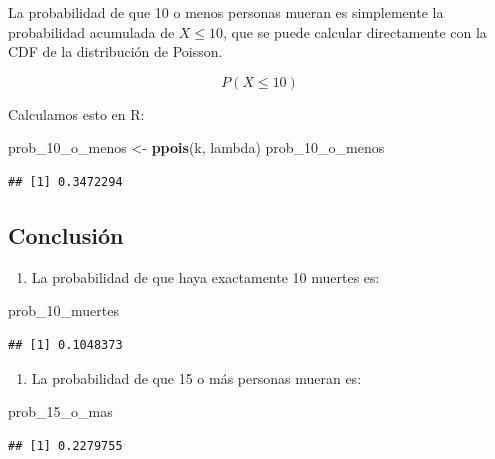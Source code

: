 \documentclass[
]{article}
\newenvironment{Shaded}{\begin{snugshade}}{\end{snugshade}}
\newcommand{\FunctionTok}[1]{\textcolor[rgb]{0.13,0.29,0.53}{\textbf{#1}}}
\newcommand{\NormalTok}[1]{#1}
\newcommand{\OtherTok}[1]{\textcolor[rgb]{0.56,0.35,0.01}{#1}}
\providecommand{\tightlist}{%
  \setlength{\itemsep}{0pt}\setlength{\parskip}{0pt}}
\begin{document}
La probabilidad de que 10 o menos personas mueran es simplemente la probabilidad acumulada de \(X \leq 10\), que se puede calcular directamente con la CDF de la distribución de Poisson.

\[ P(X \leq 10) \]

Calculamos esto en R:

\begin{Shaded}
\begin{Highlighting}[]
\NormalTok{prob\_10\_o\_menos }\OtherTok{\textless{}{-}} \FunctionTok{ppois}\NormalTok{(k, lambda)}
\NormalTok{prob\_10\_o\_menos}
\end{Highlighting}
\end{Shaded}

\begin{verbatim}
## [1] 0.3472294
\end{verbatim}

\subsection{Conclusión}\label{conclusiuxf3n}

\begin{enumerate}
\def\labelenumi{\arabic{enumi}.}
\tightlist
\item
  La probabilidad de que haya exactamente 10 muertes es:
\end{enumerate}

\begin{Shaded}
\begin{Highlighting}[]
\NormalTok{prob\_10\_muertes}
\end{Highlighting}
\end{Shaded}

\begin{verbatim}
## [1] 0.1048373
\end{verbatim}

\begin{enumerate}
\def\labelenumi{\arabic{enumi}.}
\setcounter{enumi}{1}
\tightlist
\item
  La probabilidad de que 15 o más personas mueran es:
\end{enumerate}

\begin{Shaded}
\begin{Highlighting}[]
\NormalTok{prob\_15\_o\_mas}
\end{Highlighting}
\end{Shaded}

\begin{verbatim}
## [1] 0.2279755
\end{verbatim}
\end{document}
